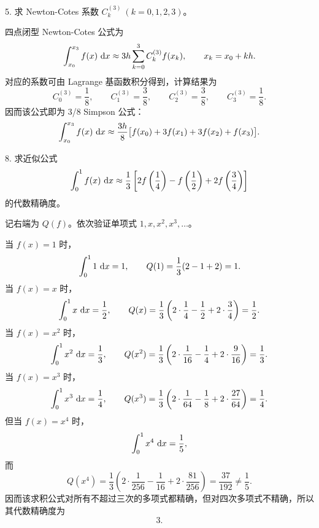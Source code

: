 \documentclass[11pt, a4paper]{ctexart}
\begin{document}
\begin{problem}{5. 求 Newton-Cotes 系数 $C_k^{(3)}\ (k=0,1,2,3)$。}
\end{problem}

\begin{solution}
    四点闭型 Newton-Cotes 公式为
    \[
        \int_{x_0}^{x_3}f(x)\,\,\mathrm{d} x \approx 3h\sum_{k=0}^{3}C_k^{(3)}f(x_k),
        \qquad x_k=x_0+kh.
    \]
    对应的系数可由 Lagrange 基函数积分得到，计算结果为
    \[
        C_0^{(3)}=\frac{1}{8},\qquad
        C_1^{(3)}=\frac{3}{8},\qquad
        C_2^{(3)}=\frac{3}{8},\qquad
        C_3^{(3)}=\frac{1}{8}.
    \]
    因而该公式即为 3/8 Simpson 公式：
    \[
        \int_{x_0}^{x_3}f(x)\,\,\mathrm{d} x
        \approx \frac{3h}{8}\bigl[f(x_0)+3f(x_1)+3f(x_2)+f(x_3)\bigr].
    \]
\end{solution}


\begin{problem}{8. 求近似公式}
    \[
        \int_0^1 f(x)\,\,\mathrm{d} x \approx \frac{1}{3}\left[2f\left(\frac{1}{4}\right)-f\left(\frac{1}{2}\right)+2f\left(\frac{3}{4}\right)\right]
    \]
    的代数精确度。
\end{problem}

\begin{solution}
    记右端为 $Q(f)$。依次验证单项式 $1,x,x^2,x^3,\ldots$。

    当 $f(x)=1$ 时，
    \[
        \int_0^1 1\,\,\mathrm{d} x=1,\qquad
        Q(1)=\frac{1}{3}(2-1+2)=1.
    \]
    当 $f(x)=x$ 时，
    \[
        \int_0^1 x\,\,\mathrm{d} x=\frac{1}{2},\qquad
        Q(x)=\frac{1}{3}\left(2\cdot \frac14-\frac12+2\cdot \frac34\right)=\frac{1}{2}.
    \]
    当 $f(x)=x^2$ 时，
    \[
        \int_0^1 x^2\,\,\mathrm{d} x=\frac{1}{3},\qquad
        Q(x^2)=\frac{1}{3}\left(2\cdot \frac{1}{16}-\frac{1}{4}+2\cdot \frac{9}{16}\right)=\frac{1}{3}.
    \]
    当 $f(x)=x^3$ 时，
    \[
        \int_0^1 x^3\,\,\mathrm{d} x=\frac{1}{4},\qquad
        Q(x^3)=\frac{1}{3}\left(2\cdot \frac{1}{64}-\frac{1}{8}+2\cdot \frac{27}{64}\right)=\frac{1}{4}.
    \]
    但当 $f(x)=x^4$ 时，
    \[
        \int_0^1 x^4\,\,\mathrm{d} x=\frac{1}{5},
    \]
    而
    \[
        Q(x^4)=\frac{1}{3}\left(2\cdot \frac{1}{256}-\frac{1}{16}+2\cdot \frac{81}{256}\right)=\frac{37}{192}\neq \frac{1}{5}.
    \]
    因而该求积公式对所有不超过三次的多项式都精确，但对四次多项式不精确，所以其代数精确度为
    \[
        3.
    \]
\end{solution}
\end{document}
